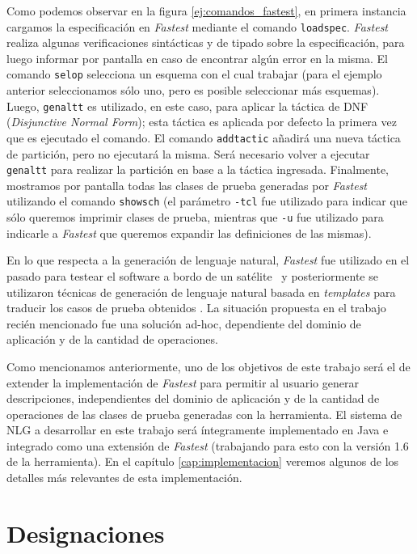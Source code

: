 Como podemos observar en la figura \ref{ej:comandos_fastest}, en primera instancia cargamos la especificación en \emph{Fastest} mediante el comando \texttt{loadspec}. \emph{Fastest} realiza algunas verificaciones sintácticas y de tipado sobre la especificación, para luego informar por pantalla en caso de encontrar algún error en la misma. El comando \texttt{selop} selecciona un esquema con el cual trabajar (para el ejemplo anterior seleccionamos sólo uno, pero es posible seleccionar más esquemas). Luego, \texttt{genaltt} es utilizado, en este caso, para aplicar la táctica de DNF (\emph{Disjunctive Normal Form}); esta táctica es aplicada por defecto la primera vez que es ejecutado el comando. El comando \texttt{addtactic} añadirá una nueva táctica de partición, pero no ejecutará la misma. Será necesario volver a ejecutar \texttt{genaltt} para realizar la partición en base a la táctica ingresada. Finalmente, mostramos por pantalla todas las clases de prueba generadas por \emph{Fastest} utilizando el comando \texttt{showsch} (el parámetro \texttt{-tcl} fue utilizado para indicar que sólo queremos imprimir clases de prueba, mientras que \texttt{-u} fue utilizado para indicarle a \emph{Fastest} que queremos expandir las definiciones de las mismas).

En lo que respecta a la generación de lenguaje natural, \emph{Fastest} fue utilizado en el pasado para testear el software a bordo de un satélite~\cite{satelite} y posteriormente se utilizaron técnicas de generación de lenguaje natural basada en \textit{templates} para traducir los casos de prueba obtenidos \cite{cristia_pluss}. La situación propuesta en el trabajo recién mencionado fue una solución ad-hoc, dependiente del dominio de aplicación y de la cantidad de operaciones.


Como mencionamos anteriormente, uno de los objetivos de este trabajo será el de extender la implementación de \emph{Fastest} para permitir al usuario generar descripciones, independientes del dominio de aplicación y de la cantidad de operaciones de las clases de prueba generadas con la herramienta.
El sistema de NLG a desarrollar en este trabajo será íntegramente implementado en Java e integrado como una extensión de \emph{Fastest} (trabajando para esto con la versión 1.6 de la herramienta). En el capítulo \ref{cap:implementacion} veremos algunos de los detalles más relevantes de esta implementación.

\section{Designaciones}
\label{cap:designaciones}

